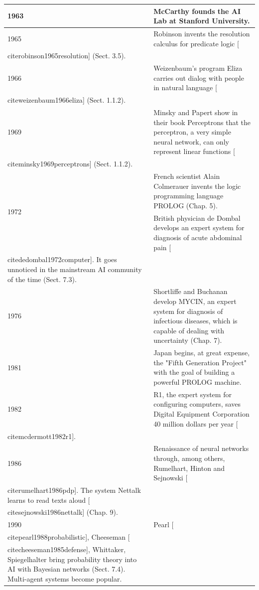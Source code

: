 \documentclass[10pt]{book}
\begin{document}
\begin{center}
\begin{tabular}{|l|l|}
\hline
1963 & McCarthy founds the AI Lab at Stanford University. \\
\hline
1965 & Robinson invents the resolution calculus for predicate logic [\\cite{robinson1965resolution}] (Sect. 3.5). \\
\hline
1966 & Weizenbaum's program Eliza carries out dialog with people in natural language [\\cite{weizenbaum1966eliza}] (Sect. 1.1.2). \\
\hline
1969 & Minsky and Papert show in their book Perceptrons that the perceptron, a very simple neural network, can only represent linear functions [\\cite{minsky1969perceptrons}] (Sect. 1.1.2). \\
\hline
\multirow[t]{2}{*}{1972} & French scientist Alain Colmerauer invents the logic programming language PROLOG (Chap. 5). \\
\hline
 & British physician de Dombal develops an expert system for diagnosis of acute abdominal pain [\\cite{dedombal1972computer}]. It goes unnoticed in the mainstream AI community of the time (Sect. 7.3). \\
\hline
1976 & Shortliffe and Buchanan develop MYCIN, an expert system for diagnosis of infectious diseases, which is capable of dealing with uncertainty (Chap. 7). \\
\hline
1981 & Japan begins, at great expense, the "Fifth Generation Project" with the goal of building a powerful PROLOG machine. \\
\hline
1982 & R1, the expert system for configuring computers, saves Digital Equipment Corporation 40 million dollars per year [\\cite{mcdermott1982r1}]. \\
\hline
1986 & Renaissance of neural networks through, among others, Rumelhart, Hinton and Sejnowski [\\cite{rumelhart1986pdp}]. The system Nettalk learns to read texts aloud [\\cite{sejnowski1986nettalk}] (Chap. 9). \\
\hline
1990 & Pearl [\\cite{pearl1988probabilistic}], Cheeseman [\\cite{cheeseman1985defense}], Whittaker, Spiegelhalter bring probability theory into AI with Bayesian networks (Sect. 7.4). Multi-agent systems become popular. \\
\hline
\end{tabular}
\end{center}
\end{document}
